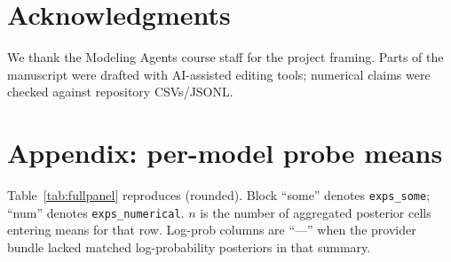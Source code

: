 \documentclass[11pt]{article}
\begin{document}
\section*{Acknowledgments}

We thank the Modeling Agents course staff for the project framing. Parts of the manuscript were drafted with AI-assisted editing tools; numerical claims were checked against repository CSVs/JSONL.





\clearpage
\onecolumn
\appendix



\section{Appendix: per-model probe means}

\label{sec:appendix}



Table~\ref{tab:fullpanel} reproduces  (rounded). Block ``some'' denotes \texttt{exps\_some}; ``num'' denotes \texttt{exps\_numerical}. $n$ is the number of aggregated posterior cells entering means for that row. Log-prob columns are ``---'' when the provider bundle lacked matched log-probability posteriors in that summary.
\end{document}
